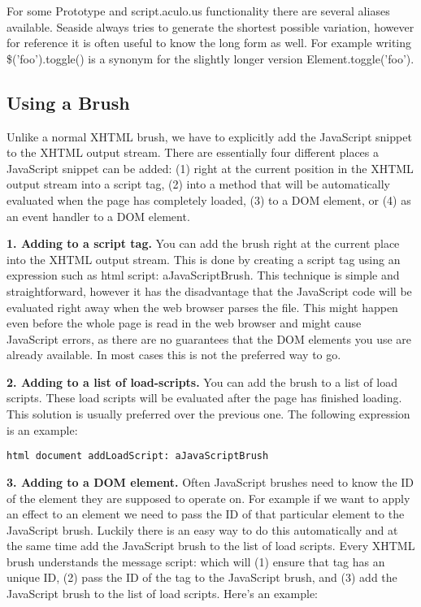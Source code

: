 \documentclass[a4paper,10pt,twoside]{book}
\newcommand{\ct}[1]{{\small\ttfamily\textup{#1}}}
\begin{document}
For some Prototype and script.aculo.us functionality there are several aliases available. Seaside always tries to generate the shortest possible variation, however for reference it is often useful to know the long form as well. For example writing \ct{\$('foo').toggle()} is a synonym for the slightly longer version \ct{Element.toggle('foo')}.

\subsection{Using a Brush}
\label{book:web20:scriptaculous:snippetsandbrushes:usebrush}

Unlike a normal XHTML brush, we have to explicitly add the JavaScript snippet to the XHTML output stream. There are essentially four different places a JavaScript snippet can be added: (1) right at the current position in the XHTML output stream into a \ct{script} tag, (2) into a method that will be automatically evaluated when the page has completely loaded, (3) to a DOM element, or (4) as an event handler to a DOM element.

\textbf{1. Adding to a script tag.} You can add the brush right at the current place into the XHTML output stream. This is done by creating a script tag using an expression such as \ct{html script: aJavaScriptBrush}. This technique is simple and straightforward, however it has the disadvantage that the JavaScript code will be evaluated right away when the web browser parses the file. This might happen even before the whole page is read in the web browser and might cause JavaScript errors, as there are no guarantees that the DOM elements you use are already available. In most cases this is not the preferred way to go.

\textbf{2. Adding to a list of load-scripts.} You can add the brush to a list of load scripts. These load scripts will be evaluated after the page has finished loading. This solution is usually preferred over the previous one. The following expression is an example:

\begin{lstlisting}
html document addLoadScript: aJavaScriptBrush
\end{lstlisting}

\textbf{3. Adding to a DOM element.} Often JavaScript brushes need to know the ID of the element they are supposed to operate on. For example if we want to apply an effect to an element we need to pass the ID of that particular element to the JavaScript brush. Luckily there is an easy way to do this automatically and at the same time add the JavaScript brush to the list of load scripts. Every XHTML brush understands the message \ct{script:} which will (1) ensure that tag has an unique ID, (2) pass the ID of the tag to the JavaScript brush, and (3) add the JavaScript brush to the list of load scripts. Here's an example:
\end{document}

